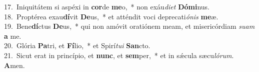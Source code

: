 {17.~}Iniquitátem si aspéxi in \textbf{cor}de \textbf{me}o,~* non exáu\textit{di}\textit{et} \textbf{Dó}\textbf{mi}nus.\\
{18.~}Proptérea exau\textbf{dí}vit \textbf{De}us,~* et atténdit voci deprecati\textit{ó}\textit{nis} \textbf{me}æ.\\
{19.~}Bene\textbf{dí}ctus \textbf{De}us,~* qui non amóvit oratiónem meam, et misericórdiam \textit{su}\textit{am} \textbf{a} me.\\
{20.~}Glória \textbf{Pa}tri, et \textbf{Fí}lio,~* et Spirí\textit{tu}\textit{i} \textbf{San}cto.\\
{21.~}Sicut erat in princípio, et \textbf{nunc}, et \textbf{sem}per,~* et in sǽcula sæcu\textit{ló}\textit{rum}. \textbf{A}men.\\
